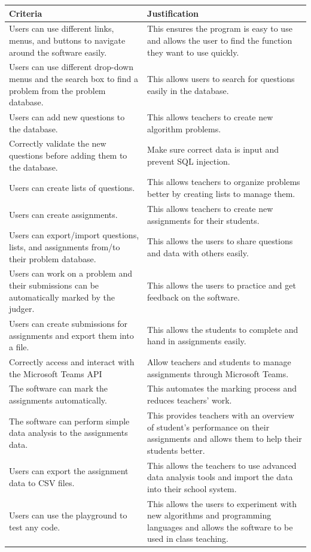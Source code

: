 \documentclass[a4paper]{report}
\begin{document}
\begin{tabulary}{\linewidth}{|L|L|}
    \hline
    Criteria & Justification\\
    \hline
    Users can use different links, menus, and buttons to navigate around the software easily. & This ensures the program is easy to use and allows the user to find the function they want to use quickly.\\
    \hline
    Users can use different drop-down menus and the search box to find a problem from the problem database. & This allows users to search for questions easily in the database.\\
    \hline
    Users can add new questions to the database. & This allows teachers to create new algorithm problems.\\
    \hline
    Correctly validate the new questions before adding them to the database. & Make sure correct data is input and prevent SQL injection.\\
    \hline
    Users can create lists of questions. & This allows teachers to organize problems better by creating lists to manage them.\\
    \hline
    Users can create assignments. & This allows teachers to create new assignments for their students.\\
    \hline
    Users can export/import questions, lists, and assignments from/to their problem database. & This allows the users to share questions and data with others easily.\\
    \hline
    Users can work on a problem and their submissions can be automatically marked by the judger. & This allows the users to practice and get feedback on the software.\\
    \hline
    Users can create submissions for assignments and export them into a file. & This allows the students to complete and hand in assignments easily.\\
    \hline
    Correctly access and interact with the Microsoft Teams API & Allow teachers and students to manage assignments through Microsoft Teams.\\
    \hline
    The software can mark the assignments automatically. & This automates the marking process and reduces teachers' work.\\
    \hline
    The software can perform simple data analysis to the assignments data. & This provides teachers with an overview of student's performance on their assignments and allows them to help their students better.\\
    \hline
    Users can export the assignment data to CSV files. & This allows the teachers to use advanced data analysis tools and import the data into their school system.\\
    \hline
    Users can use the playground to test any code. & This allows the users to experiment with new algorithms and programming languages and allows the software to be used in class teaching.\\
    \hline
\end{tabulary}
\end{document}
